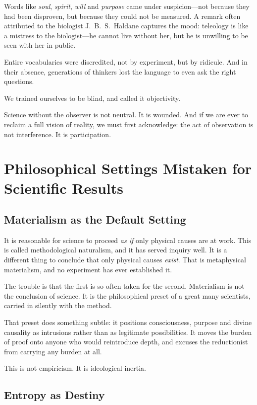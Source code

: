 \documentclass[11pt,a4paper]{article}
\begin{document}
Words like \emph{soul}, \emph{spirit}, \emph{will} and \emph{purpose} came under suspicion---not because they had been disproven, but because they could not be measured. A remark often attributed to the biologist J.~B.~S.~Haldane captures the mood: teleology is like a mistress to the biologist---he cannot live without her, but he is unwilling to be seen with her in public.

Entire vocabularies were discredited, not by experiment, but by ridicule. And in their absence, generations of thinkers lost the language to even ask the right questions.

We trained ourselves to be blind, and called it objectivity.

Science without the observer is not neutral. It is wounded. And if we are ever to reclaim a full vision of reality, we must first acknowledge: the act of observation is not interference. It is participation.

\section{Philosophical Settings Mistaken for Scientific Results}

\subsection{Materialism as the Default Setting}

It is reasonable for science to proceed \emph{as if} only physical causes are at work. This is called methodological naturalism, and it has served inquiry well. It is a different thing to conclude that only physical causes \emph{exist}. That is metaphysical materialism, and no experiment has ever established it.

The trouble is that the first is so often taken for the second. Materialism is not the conclusion of science. It is the philosophical preset of a great many scientists, carried in silently with the method.

That preset does something subtle: it positions consciousness, purpose and divine causality as intrusions rather than as legitimate possibilities. It moves the burden of proof onto anyone who would reintroduce depth, and excuses the reductionist from carrying any burden at all.

This is not empiricism. It is ideological inertia.

\subsection{Entropy as Destiny}
\end{document}
